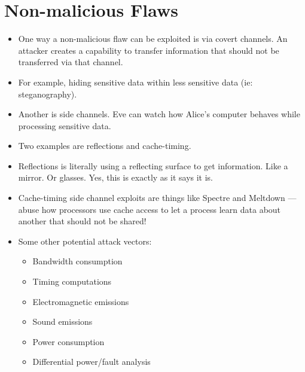 \documentclass{article}
\begin{document}
\section{Non-malicious Flaws}
\begin{itemize}
    \item One way a non-malicious flaw can be exploited is via covert channels.  An attacker creates a capability to transfer information that should not be transferred via that channel.
    \item For example, hiding sensitive data within less sensitive data (ie: steganography).
    \item Another is side channels.  Eve can watch how Alice's computer behaves while processing sensitive data.
    \item Two examples are reflections and cache-timing.
    \item Reflections is literally using a reflecting surface to get information.  Like a mirror.  Or glasses.  Yes, this is exactly as it says it is.
    \item Cache-timing side channel exploits are things like Spectre and Meltdown --- abuse how processors use cache access to let a process learn data about another that should not be shared!
    \item Some other potential attack vectors:
        \begin{itemize}
            \item Bandwidth consumption
            \item Timing computations
            \item Electromagnetic emissions
            \item Sound emissions
            \item Power consumption
            \item Differential power/fault analysis
        \end{itemize}
\end{itemize}
\end{document}
